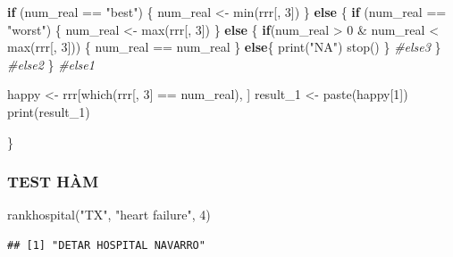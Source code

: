 \documentclass[
]{book}
\newenvironment{Shaded}{\begin{snugshade}}{\end{snugshade}}
\newcommand{\CommentTok}[1]{\textcolor[rgb]{0.56,0.35,0.01}{\textit{#1}}}
\newcommand{\ControlFlowTok}[1]{\textcolor[rgb]{0.13,0.29,0.53}{\textbf{#1}}}
\newcommand{\DecValTok}[1]{\textcolor[rgb]{0.00,0.00,0.81}{#1}}
\newcommand{\FunctionTok}[1]{\textcolor[rgb]{0.00,0.00,0.00}{#1}}
\newcommand{\NormalTok}[1]{#1}
\newcommand{\OtherTok}[1]{\textcolor[rgb]{0.56,0.35,0.01}{#1}}
\newcommand{\SpecialCharTok}[1]{\textcolor[rgb]{0.00,0.00,0.00}{#1}}
\newcommand{\StringTok}[1]{\textcolor[rgb]{0.31,0.60,0.02}{#1}}
\theoremstyle{definition}
\theoremstyle{definition}
\theoremstyle{definition}
\theoremstyle{definition}
\theoremstyle{remark}
\begin{document}
\begin{Shaded}
\begin{Highlighting}[]
  \ControlFlowTok{if}\NormalTok{ (num\_real }\SpecialCharTok{==} \StringTok{"best"}\NormalTok{) \{}
\NormalTok{    num\_real }\OtherTok{\textless{}{-}} \FunctionTok{min}\NormalTok{(rrr[, }\DecValTok{3}\NormalTok{])}
\NormalTok{  \} }\ControlFlowTok{else}\NormalTok{ \{}
    \ControlFlowTok{if}\NormalTok{ (num\_real }\SpecialCharTok{==} \StringTok{"worst"}\NormalTok{)  \{}
\NormalTok{      num\_real }\OtherTok{\textless{}{-}} \FunctionTok{max}\NormalTok{(rrr[, }\DecValTok{3}\NormalTok{])}
\NormalTok{    \} }\ControlFlowTok{else}\NormalTok{ \{}
      \ControlFlowTok{if}\NormalTok{(num\_real }\SpecialCharTok{\textgreater{}} \DecValTok{0} \SpecialCharTok{\&}\NormalTok{ num\_real }\SpecialCharTok{\textless{}} \FunctionTok{max}\NormalTok{(rrr[, }\DecValTok{3}\NormalTok{]))  \{}
\NormalTok{         num\_real }\SpecialCharTok{==}\NormalTok{ num\_real}
\NormalTok{      \}}
      \ControlFlowTok{else}\NormalTok{\{}
        \FunctionTok{print}\NormalTok{(}\StringTok{"NA"}\NormalTok{)}
        \FunctionTok{stop}\NormalTok{()}
\NormalTok{    \} }\CommentTok{\#else3 }
\NormalTok{    \} }\CommentTok{\#else2 }
\NormalTok{    \} }\CommentTok{\#else1}
  
\NormalTok{  happy }\OtherTok{\textless{}{-}}\NormalTok{ rrr[}\FunctionTok{which}\NormalTok{(rrr[, }\DecValTok{3}\NormalTok{] }\SpecialCharTok{==}\NormalTok{ num\_real), ]}
\NormalTok{  result\_1 }\OtherTok{\textless{}{-}} \FunctionTok{paste}\NormalTok{(happy[}\DecValTok{1}\NormalTok{])}
  \FunctionTok{print}\NormalTok{(result\_1)}
  
\NormalTok{\}}
\end{Highlighting}
\end{Shaded}

\hypertarget{test-huxe0m-1}{%
\subsubsection{TEST HÀM}\label{test-huxe0m-1}}

\begin{Shaded}
\begin{Highlighting}[]
\FunctionTok{rankhospital}\NormalTok{(}\StringTok{"TX"}\NormalTok{, }\StringTok{"heart failure"}\NormalTok{, }\DecValTok{4}\NormalTok{)}
\end{Highlighting}
\end{Shaded}

\begin{verbatim}
## [1] "DETAR HOSPITAL NAVARRO"
\end{verbatim}
\end{document}
